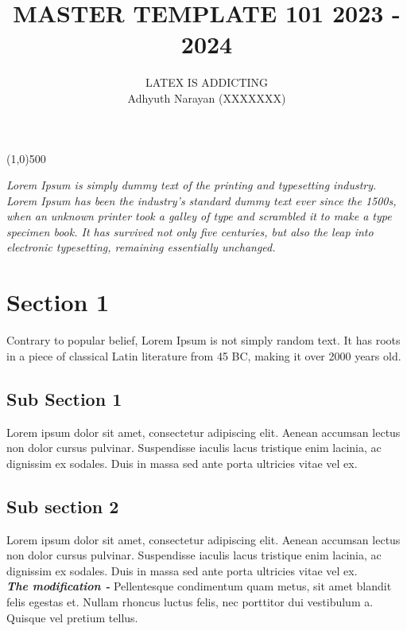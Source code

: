 \documentclass[a4paper,12pt]{article}
\begin{document}
 
 
\title{\Large \textbf{\textbf{MASTER TEMPLATE 101 2023 - 2024}}}
\author{LATEX IS ADDICTING\\ 
Adhyuth Narayan (XXXXXXX)}
\maketitle
\line(1,0){500}
\vspace{10mm}

\textit{Lorem Ipsum is simply dummy text of the printing and typesetting industry. Lorem Ipsum has been the industry's standard dummy text ever since the 1500s, when an unknown printer took a galley of type and scrambled it to make a type specimen book. It has survived not only five centuries, but also the leap into electronic typesetting, remaining essentially unchanged.}

\vspace{6mm}   
\section{Section 1}

Contrary to popular belief, Lorem Ipsum is not simply random text. It has roots in a piece of classical Latin literature from 45 BC, making it over 2000 years old.

\vspace{3mm}

\subsection{Sub Section 1}
 Lorem ipsum dolor sit amet, consectetur adipiscing elit. Aenean accumsan lectus non dolor cursus pulvinar. Suspendisse iaculis lacus tristique enim lacinia, ac dignissim ex sodales. Duis in massa sed ante porta ultricies vitae vel ex. \\

\subsection{Sub section 2}
Lorem ipsum dolor sit amet, consectetur adipiscing elit. Aenean accumsan lectus non dolor cursus pulvinar. Suspendisse iaculis lacus tristique enim lacinia, ac dignissim ex sodales. Duis in massa sed ante porta ultricies vitae vel ex. \\

\textbf{\textit{The modification - }}Pellentesque condimentum quam metus, sit amet blandit felis egestas et. Nullam rhoncus luctus felis, nec porttitor dui vestibulum a. Quisque vel pretium tellus.
\end{document}
